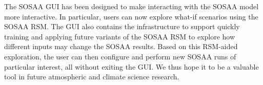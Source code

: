 \newpar The SOSAA GUI has been designed to make interacting with the SOSAA model more interactive. In particular, users can now explore what-if scenarios using the SOSAA RSM. The GUI also contains the infrastructure to support quickly training and applying future variants of the SOSAA RSM to explore how different inputs may change the SOSAA results. Based on this RSM-aided exploration, the user can then configure and perform new SOSAA runs of particular interest, all without exiting the GUI. We thus hope it to be a valuable tool in future atmospheric and climate science research.
